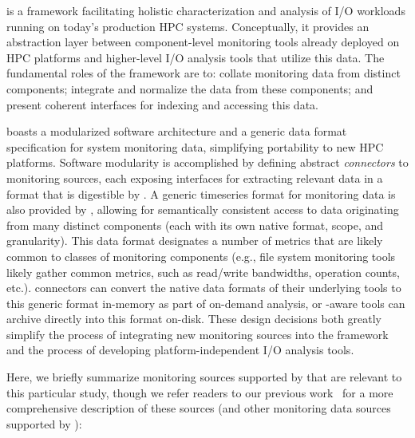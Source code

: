 \tokio is a framework facilitating holistic characterization and analysis of I/O workloads running on today's production HPC systems. Conceptually, it provides an abstraction layer between component-level monitoring tools already deployed on HPC platforms and higher-level I/O analysis tools that utilize this data. The fundamental roles of the \tokio framework are to: collate monitoring data from distinct components; integrate and normalize the data from these components; and present coherent interfaces for indexing and accessing this data.

\tokio boasts a modularized software architecture and a generic data format specification for system monitoring data, simplifying portability to new HPC platforms. Software modularity is accomplished by defining abstract \textit{connectors} to monitoring sources, each exposing interfaces for extracting relevant data in a format that is digestible by \tokio.  A generic timeseries format for monitoring data is also provided by \tokio, allowing for semantically consistent access to data originating from many distinct components (each with its own native format, scope, and granularity). This data format designates a number of metrics that are likely common to classes of monitoring components (e.g., file system monitoring tools likely gather common metrics, such as read/write bandwidths, operation counts, etc.). \tokio connectors can convert the native data formats of their underlying tools to this generic format in-memory as part of on-demand analysis, or \tokio-aware tools can archive directly into this format on-disk. These design decisions both greatly simplify the process of integrating new monitoring sources into the framework and the process of developing platform-independent I/O analysis tools.

Here, we briefly summarize monitoring sources supported by \tokio that are relevant to this particular study, though we refer readers to our previous work~\cite{Lockwood2017, Lockwood2018tokio} for a more comprehensive description of these sources (and other monitoring data sources supported by \tokio):

